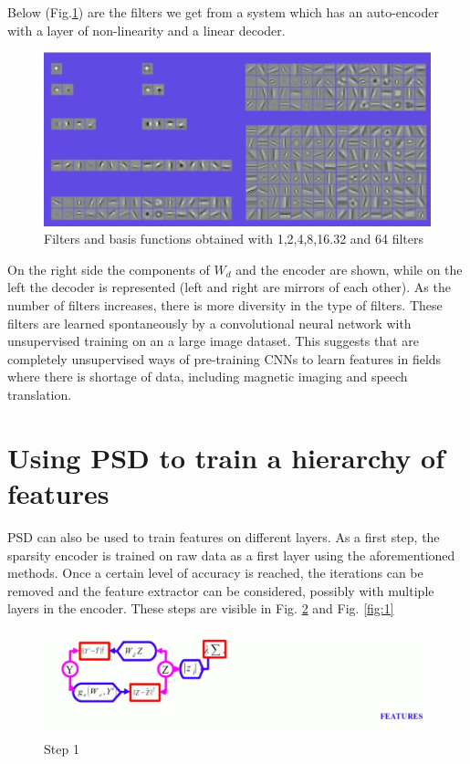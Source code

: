 Below (Fig.\ref{fig:MultipleFilters}) are the filters we get from a system which has an auto-encoder with a layer of non-linearity and a linear decoder. 
\begin{figure}[H]
  \includegraphics[width=\linewidth]{lectures/12-a/MultipleFilters.jpg}
  \caption{Filters and basis functions obtained with 1,2,4,8,16.32 and 64 filters}
  \label{fig:MultipleFilters}
\end{figure}
On the right side the components of $W_d$ and the encoder are shown, while on the left the decoder is represented (left and right are mirrors of each other). As the number of filters increases, there is more diversity in the type of filters. These filters are learned spontaneously by a convolutional neural network with unsupervised training on an a large image dataset. This suggests that are completely unsupervised ways of pre-training CNNs to learn features in fields where there is shortage of data, including magnetic imaging and speech translation.


\section{Using PSD to train a hierarchy of features}
PSD can also be used to train features on different layers. As a first step, the sparsity encoder is trained on raw data as a first layer using the aforementioned methods. Once a certain level of accuracy is reached, the iterations can be removed and the feature extractor can be considered, possibly with multiple layers in the encoder. These steps are visible in Fig. \ref{fig:0} and Fig. \ref{fig:1} 
\begin{figure}[h!]
  \includegraphics[width=\linewidth]{lectures/12-a/0.jpg}
  \caption{Step 1}
  \label{fig:0}
\end{figure}

